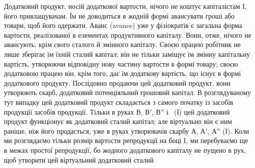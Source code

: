 Додатковий продукт, носій додаткової вартости, нічого не коштує
капіталістам І, його привлащувачам. Їм не доводиться в жодній формі
авансувати гроші або товари, щоб його одержати. Аванс (avance)
уже у фізіократів є загальна форма вартости, реалізованої в елементах
продуктивного капіталу. Вони, отже, нічого не авансують, крім свого сталого
й змінного капіталу. Своєю працею робітник не лише зберігає їм
їхній сталий капітал; він не тільки заміщує їм змінну капітальну вартість,
утворюючи відповідну нову частину вартости в формі товару; своєю додатковою
працею він, крім того, дає їм додаткову вартість, що існує
в формі додаткового продукту. Послідовно продаючи цей додатковий
продукт, вони утворюють скарб, додатковий потенціяльний грошовий капітал.
В розглядуваному тут випадку цей додатковий продукт складається
з самого початку із засобів продукції засобів продукції. Тільки в руках
$В$, $В'$, $В''$ і~ (І) цей додатковий продукт функціонує як додатковий
сталий капітал; але віртуально він є ним раніше, ніж його продасться,
уже в руках утворювачів скарбу $А$, $А'$, $А''$ (І). Коли ми розглядаємо
тільки розмір вартости репродукції на боці І, ми перебуваємо
ще в межах простої репродукції, бо жодного додаткового капіталу
не пущено в рух, щоб утворити цей віртуальний додатковий сталий
\parbreak{}  %
